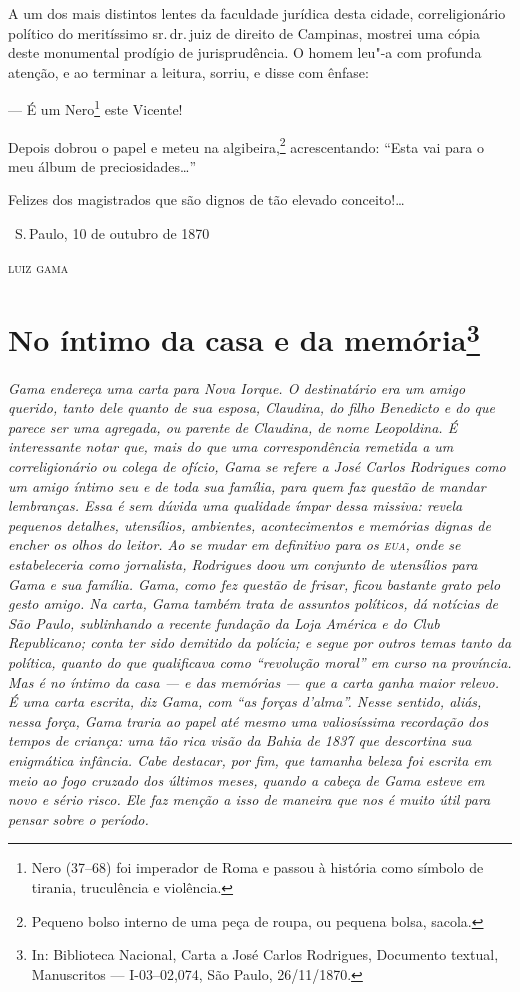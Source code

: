 A um dos mais distintos lentes da faculdade jurídica desta cidade,
correligionário político do meritíssimo sr.\,dr.\,juiz de direito de
Campinas, mostrei uma cópia deste monumental prodígio de jurisprudência.
O homem leu"-a com profunda atenção, e ao terminar a leitura, sorriu, e
disse com ênfase:

--- É um Nero\footnote{Nero (37--68) foi imperador de Roma e passou à
  história como símbolo de tirania, truculência e violência.} este
Vicente!

Depois dobrou o papel e meteu na algibeira,\footnote{Pequeno bolso
  interno de uma peça de roupa, ou pequena bolsa, sacola.}
acrescentando: ``Esta vai
para o meu álbum de preciosidades\ldots{}''

Felizes dos magistrados que são dignos de tão elevado conceito!\ldots{}

\bigskip

\hfill\ S.\,Paulo, 10 de outubro de 1870\smallskip

\hfill\textsc{luiz gama}

\chapter{No íntimo da casa e da memória\footnote[*]{In: Biblioteca
  Nacional, Carta a José Carlos Rodrigues, Documento textual,
  Manuscritos --- I-03--02,074, São Paulo, 26/11/1870.}}

\begin{flushleft}
{\footnotesize\itshape
Gama endereça uma carta para Nova Iorque. O destinatário era
um amigo querido, tanto dele quanto de sua esposa, Claudina, do
filho Benedicto e do que parece ser uma agregada, ou parente de
Claudina, de nome Leopoldina. É interessante notar que, mais do que uma
correspondência remetida a um correligionário ou colega de ofício, Gama
se refere a José Carlos Rodrigues como um amigo íntimo seu e de toda sua
família, para quem faz questão de mandar lembranças. Essa é sem dúvida
uma qualidade ímpar dessa missiva: revela pequenos detalhes, utensílios,
ambientes, acontecimentos e memórias dignas de
encher os olhos do leitor. Ao se mudar em definitivo para os \textsc{eua},
onde se estabeleceria como jornalista, Rodrigues doou
um conjunto de utensílios para Gama e sua família. Gama, como fez
questão de frisar, ficou bastante grato pelo gesto amigo. Na carta, Gama
também trata de assuntos políticos, dá notícias de São Paulo,
sublinhando a recente fundação da Loja América e do Club Republicano;
conta ter sido demitido da
polícia; e segue por outros temas tanto da
política, quanto do que qualificava como
``revolução moral'' em curso na província. Mas é no íntimo da casa --- e
das memórias --- que a carta ganha maior relevo. É uma carta escrita, diz
Gama, com ``as forças d'alma''. Nesse sentido, aliás, nessa força, Gama
traria ao papel até mesmo uma valiosíssima recordação dos tempos de
criança: uma tão rica visão da Bahia de 1837 que descortina
sua enigmática infância.
Cabe destacar, por fim, que tamanha
beleza foi escrita em meio ao fogo cruzado dos últimos
meses, quando a cabeça de Gama esteve em novo e sério risco. Ele faz
menção a isso de maneira que nos é muito útil para pensar sobre o
período.}
\end{flushleft}


